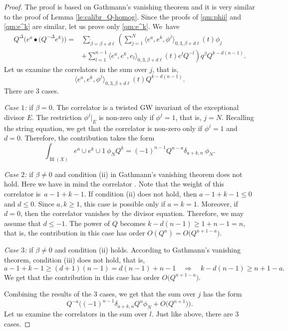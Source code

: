 \documentclass[10pt,a4paper]{article}
\numberwithin{equation}{section}
\begin{document}
\begin{proof}
The proof is based on Gathmann's vanishing theorem and it is very
similar to the proof of Lemma \ref{le:calibr_Q-homog}.
Since the proofs of \eqref{qm:phii} and \eqref{qm:e^k} are similar, let
us prove only \eqref{qm:e^k}. We~have
\begin{align*}
Q^\Delta \big(e^a\bullet \big(Q^{-\Delta} e^k\big) \big)={}&
\sum_{\widetilde{\beta}=\beta+d\ell}
\left(
\sum_{j=1}^N
\big\langle e^a, e^k, \phi^j\big\rangle_{0,3,\beta+ d\ell}(t)
\phi_j \right.\\
&\left.+
\sum_{l=1}^{n-1} \big\langle e^a, e^k, e_l\big\rangle_{0,3,\beta+d\ell} (t)
e^l Q^{-l}
\right) q^\beta Q^{k-d(n-1)}.
\end{align*}
Let us examine the correlators in the sum over $j$, that is,
\[
\big\langle e^a, e^k, \phi^j\big\rangle_{0,3,\beta+ d\ell}(t) Q^{k -d(n-1)}.
\]
There are 3 cases.

{\em Case $1$:} if $\beta=0$. The correlator is a twisted GW invariant
of the exceptional divisor $E$. The restriction $\phi^j|_E$ is
non-zero only if $\phi^j=1$, that is, $j=N$. Recalling the string equation, we get that
the correlator is non-zero only if $\phi^j=1$ and $d=0$. Therefore,
the contribution takes the form
\[
\int_{\operatorname{Bl}(X)} e^a\cup e^k \cup 1\ \phi_N Q^{k} =
(-1)^{n-1} Q^{n-a} \delta_{a+k,n}\ \phi_N.
\]

{\em Case $2$:} if $\beta\neq 0$ and condition (ii) in Gathmann's
vanishing theorem does not hold. Here we have in mind the correlator
. Note that the
weight of this correlator is~${a-1+k-1}$. If condition (ii) does not
hold, then $a-1+k-1\leq 0$ and $d\leq 0$. Since $a,k\geq 1$, this case
is possible only if $a=k=1$. Moreover, if $d=0$, then the correlator
vanishes by the divisor equation. Therefore, we may assume that $d\leq
-1$. The power of $Q$ becomes $k-d(n-1)\geq 1 + n-1=n$, that is, the
contribution in this case has order $O(Q^n)=O\big(Q^{n+1-a}\big)$.

{\em Case $3$:} if $\beta\neq 0$ and condition (ii) holds. According to
Gathmann's vanishing theorem, condition (iii) does not hold, that is,
\[
a-1+k-1\geq (d+1)(n-1)=d(n-1)+n-1\quad \Rightarrow\quad
k-d(n-1)\geq n+1-a.
\]
We get that the contribution in this case has order $O\big(Q^{n+1-a}\big)$.

Combining the results of the 3 cases, we get that the sum over $j$ has
the form
\[
Q^{-a} \big(
(-1)^{n-1} \delta_{a+k,n} Q^n\phi_N + O\big(Q^{n+1}\big)
\big).
\]
Let us examine the correlators in the sum over $l$. Just like above,
there are 3 cases.


\end{proof}
\end{document}
